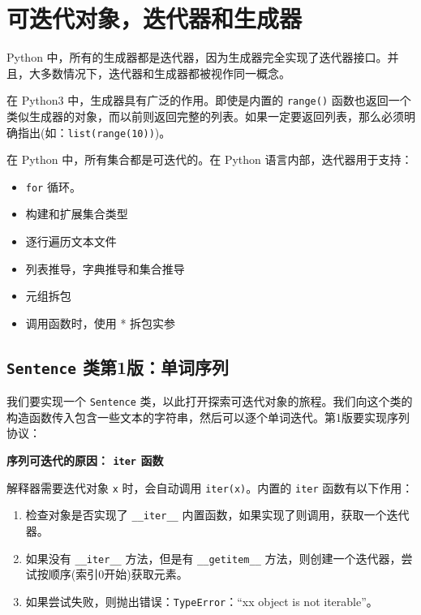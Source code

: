\section{可迭代对象，迭代器和生成器}

Python 中，所有的生成器都是迭代器，因为生成器完全实现了迭代器接口。并且，大多数情况下，迭代器和生成器都被视作同一概念。

在 Python3 中，生成器具有广泛的作用。即使是内置的 \texttt{range()} 函数也返回一个类似生成器的对象，而以前则返回完整的列表。如果一定要返回列表，那么必须明确指出(如：\texttt{list(range(10))})。

在 Python 中，所有集合都是可迭代的。在 Python 语言内部，迭代器用于支持：
\begin{itemize}
    \item \texttt{for} 循环。
    \item 构建和扩展集合类型
    \item 逐行遍历文本文件
    \item 列表推导，字典推导和集合推导
    \item 元组拆包
    \item 调用函数时，使用 * 拆包实参
\end{itemize}

\subsection{\texttt{Sentence} 类第1版：单词序列}

我们要实现一个 \texttt{Sentence} 类，以此打开探索可迭代对象的旅程。我们向这个类的构造函数传入包含一些文本的字符串，然后可以逐个单词迭代。第1版要实现序列协议：



\noindent\textbf{序列可迭代的原因： \texttt{iter} 函数}

解释器需要迭代对象 \texttt{x} 时，会自动调用 \texttt{iter(x)}。内置的 \texttt{iter} 函数有以下作用：

\begin{enumerate}
    \item 检查对象是否实现了 \texttt{\_\_iter\_\_} 内置函数，如果实现了则调用，获取一个迭代器。
    \item 如果没有 \texttt{\_\_iter\_\_} 方法，但是有 \texttt{\_\_getitem\_\_} 方法，则创建一个迭代器，尝试按顺序(索引0开始)获取元素。
    \item 如果尝试失败，则抛出错误：\texttt{TypeError}：``xx object is not iterable''。
\end{enumerate}

